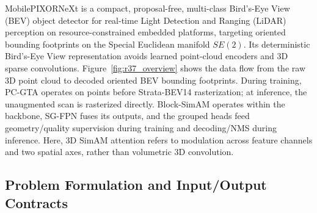
MobilePIXORNeXt is a compact, proposal-free, multi-class Bird's-Eye View (BEV) object detector for real-time Light Detection and Ranging (LiDAR) perception on resource-constrained embedded platforms, targeting oriented bounding footprints on the Special Euclidean manifold $SE(2)$. Its deterministic Bird's-Eye View representation avoids learned point-cloud encoders and 3D sparse convolutions. Figure~\ref{fig:r37_overview} shows the data flow from the raw 3D point cloud to decoded oriented BEV bounding footprints. During training, PC-GTA operates on points before Strata-BEV14 rasterization; at inference, the unaugmented scan is rasterized directly. Block-SimAM operates within the backbone, SG-FPN fuses its outputs, and the grouped heads feed geometry/quality supervision during training and decoding/NMS during inference. Here, 3D SimAM attention refers to modulation across feature channels and two spatial axes, rather than volumetric 3D convolution.

\par\vspace{-0.5\baselineskip}
\subsection{Problem Formulation and Input/Output Contracts}
\label{sec:problem_formulation}

